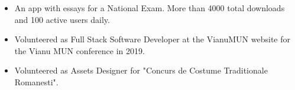 \begin{itemize}
    \item An app with essays for a National Exam. More than 4000 total downloads and 100 active users daily.
\end{itemize}
\begin{itemize}
    \item Volunteered as Full Stack Software Developer at the VianuMUN website for the Vianu MUN conference in 2019.
    \item Volunteered as Assets Designer for "Concurs de Costume Traditionale Romanesti".
\end{itemize}